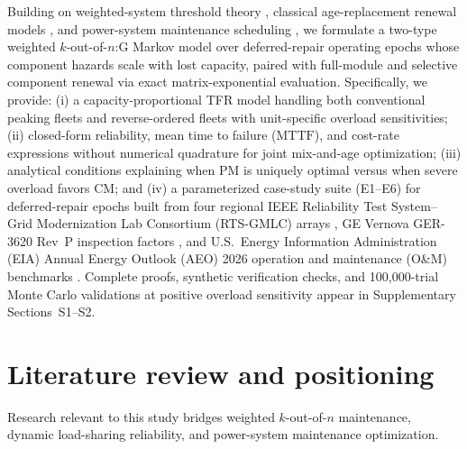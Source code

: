 \documentclass{elektr}
\begin{document}
Building on weighted-system threshold theory \cite{wu1994,eryilmaz2014two,rushdi2018}, classical age-replacement renewal models \cite{nakagawa2005}, and power-system maintenance scheduling \cite{fotuhi2014,almuhaini2017}, we formulate a two-type weighted $k$-out-of-$n$:G Markov model over deferred-repair operating epochs whose component hazards scale with lost capacity, paired with full-module and selective component renewal via exact matrix-exponential evaluation. Specifically, we provide: (i) a capacity-proportional TFR model handling both conventional peaking fleets and reverse-ordered fleets with unit-specific overload sensitivities; (ii) closed-form reliability, mean time to failure ($\mathrm{MTTF}$), and cost-rate expressions without numerical quadrature for joint mix-and-age optimization; (iii) analytical conditions explaining when PM is uniquely optimal versus when severe overload favors CM; and (iv) a parameterized case-study suite (E1--E6) for deferred-repair epochs built from four regional IEEE Reliability Test System--Grid Modernization Lab Consortium (RTS-GMLC) arrays \cite{barrows2020}, GE Vernova GER-3620 Rev~P inspection factors \cite{ger3620}, and U.S.\ Energy Information Administration (EIA) Annual Energy Outlook (AEO) 2026 operation and maintenance (O\&M) benchmarks \cite{eia2026}. Complete proofs, synthetic verification checks, and 100,000-trial Monte Carlo validations at positive overload sensitivity appear in Supplementary Sections~S1--S2.

\section{Literature review and positioning}
\label{sec:lit}

Research relevant to this study bridges weighted $k$-out-of-$n$ maintenance, dynamic load-sharing reliability, and power-system maintenance optimization.
\end{document}
